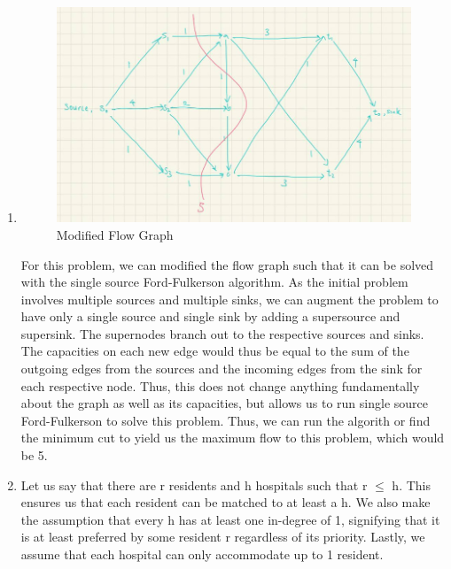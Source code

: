 \documentclass[12pt,letterpaper]{article}
\begin{document}
\begin{enumerate}
  \item 
    \begin{figure}[!h]
      \centering
      \includegraphics[width=0.9\linewidth]{q3.1.jpg}
      \caption{Modified Flow Graph}
      \end{figure}
      
    For this problem, we can modified the flow graph such that it can be solved with the 
    single source Ford-Fulkerson algorithm.
    As the initial problem involves multiple sources and multiple sinks, 
    we can augment the problem to have only a single source and single sink by
    adding a supersource and supersink.
    The supernodes branch out to the respective sources and sinks.
    The capacities on each new edge would thus be equal to the sum of the outgoing edges from
    the sources and the incoming edges from the sink for each respective node.
    Thus, this does not change anything fundamentally about the graph as well as its capacities,
    but allows us to run single source Ford-Fulkerson to solve this problem.
    Thus, we can run the algorith or find the minimum cut to yield us
    the maximum flow to this problem, which would be 5.
  \item 
    Let us say that there are r residents and h hospitals such that r $\leq$ h.
    This ensures us that each resident can be matched to at least a h.
    We also make the assumption that every h has at least one in-degree of 1, 
    signifying that it is at least preferred by some resident r regardless of its priority.
    Lastly, we assume that each hospital can only accommodate up to 1 resident. \\
    

\end{enumerate}
\end{document}
